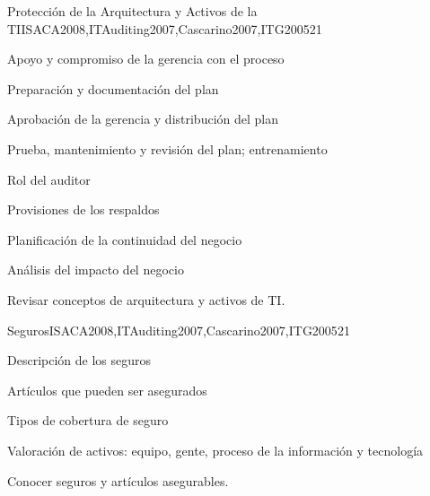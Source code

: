 \begin{syllabus}
    \begin{unit}{Protección de la Arquitectura y Activos de la TI}{}{ISACA2008,ITAuditing2007,Cascarino2007,ITG2005}{2}{1}
    \begin{topics}
    \item Apoyo y compromiso de la gerencia con el proceso
    \item Preparación y documentación del plan
    \item Aprobación de la gerencia y distribución del plan
    \item Prueba, mantenimiento y revisión del plan; entrenamiento
    \item Rol del auditor
    \item Provisiones de los respaldos
    \item Planificación de la continuidad del negocio
    \item Análisis del impacto del negocio
    \end{topics}
    \begin{learningoutcomes}
    \item Revisar conceptos de arquitectura y activos de TI.
    \end{learningoutcomes}
    \end{unit}
    
    \begin{unit}{Seguros}{}{ISACA2008,ITAuditing2007,Cascarino2007,ITG2005}{2}{1}
    \begin{topics}
    \item Descripción de los seguros
    \item Artículos que pueden ser asegurados
    \item Tipos de cobertura de seguro
    \item Valoración de activos: equipo, gente, proceso de la información y tecnología
    \end{topics}
    \begin{learningoutcomes}
    \item Conocer seguros y artículos asegurables.
    \end{learningoutcomes}
    \end{unit}
    

\end{syllabus}
